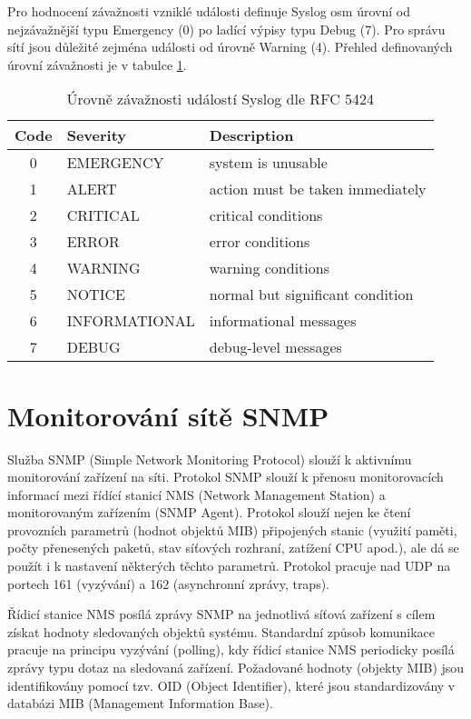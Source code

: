 Pro hodnocení závažnosti vzniklé události definuje Syslog osm úrovní od nejzávažnější typu Emergency (0) po ladící výpisy typu Debug (7). Pro správu sítí jsou důležité zejména události od úrovně Warning (4). Přehled definovaných úrovní závažnosti je v tabulce \ref{tab:severity}. 
\begin{table}[h]
  \centering
  \small
  \begin{tabular}{|c|l|l|}
    \hline
    \bf Code & \bf Severity & \bf Description \\
    \hline
    0 & EMERGENCY & system is unusable  \\
    1 & ALERT & action must be taken immediately\\
    2 & CRITICAL & critical conditions \\
    3 & ERROR & error conditions\\
    4 & WARNING & warning conditions\\
    5 & NOTICE & normal but significant condition\\
    6 & INFORMATIONAL & informational messages\\
    7 & DEBUG & debug-level messages\\
    \hline
  \end{tabular}
  \caption{Úrovně závažnosti událostí Syslog dle RFC 5424 \cite{rfc5424}}\label{tab:severity}
\end{table}


\clearpage
\section{Monitorování sítě SNMP}\label{snmp}

Služba SNMP (Simple Network Monitoring Protocol) slouží k aktivnímu monitorování zařízení na síti. Protokol SNMP \cite{rfc3412} slouží k přenosu monitorovacích informací mezi řídící stanicí NMS (Network Management Station) a monitorovaným zařízením (SNMP Agent). Protokol slouží nejen ke čtení provozních parametrů (hodnot objektů MIB) připojených stanic (využití paměti, počty přenesených paketů, stav síťových rozhraní, zatížení CPU apod.), ale dá se použít i k  nastavení některých těchto parametrů. Protokol pracuje nad UDP na portech 161 (vyzývání) a 162 (asynchronní zprávy, traps).

Řídicí stanice NMS posílá zprávy SNMP na jednotlivá síťová zařízení s cílem získat hodnoty sledovaných objektů systému. Standardní způsob komunikace pracuje na principu vyzývání (polling), kdy řídicí stanice NMS periodicky posílá zprávy typu dotaz na sledovaná zařízení. Požadované hodnoty (objekty MIB) jsou identifikovány pomocí tzv. OID (Object Identifier), které jsou standardizovány v databázi MIB (Management Information Base).

